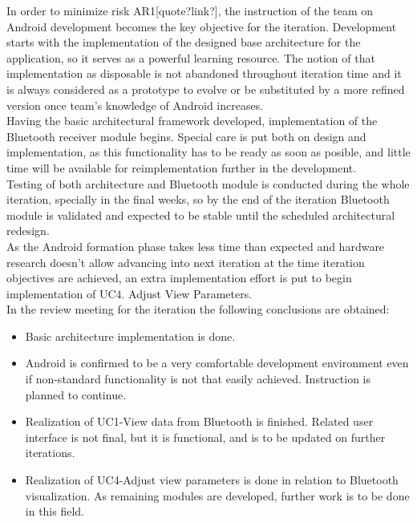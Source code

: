 			In order to minimize risk AR1[quote?link?], the instruction of the team on Android development becomes the key objective for the iteration. Development starts with the implementation of the designed base architecture for the application, so it serves as a powerful learning resource. The notion of that implementation as disposable is not abandoned throughout iteration time and it is always considered as a prototype to evolve or be substituted by a more refined version once team's knowledge of Android increases.\\

			Having the basic architectural framework developed, implementation of the Bluetooth receiver module begins. Special care is put both on design and implementation, as this functionality has to be ready as soon as posible, and little time will be available for reimplementation further in the development.\\

			Testing of both architecture and Bluetooth module is conducted during the whole iteration, specially in the final weeks, so by the end of the iteration Bluetooth module is validated and expected to be stable until the scheduled architectural redesign.\\

			As the Android formation phase takes less time than expected and hardware research doesn't allow advancing into next iteration at the time iteration objectives are achieved, an extra implementation effort is put to begin implementation of UC4. Adjust View Parameters.\\

			In the review meeting for the iteration the following conclusions are obtained:
			\begin{itemize}
				\item Basic architecture implementation is done.
				\item Android is confirmed to be a very comfortable development environment even if non-standard functionality is not that easily achieved. Instruction is planned to continue.
				\item Realization of UC1-View data from Bluetooth is finished. Related user interface is not final, but it is functional, and is to be updated on further iterations.
				\item Realization of UC4-Adjust view parameters is done in relation to Bluetooth visualization. As remaining modules are developed, further work is to be done in this field.
			\end{itemize}

